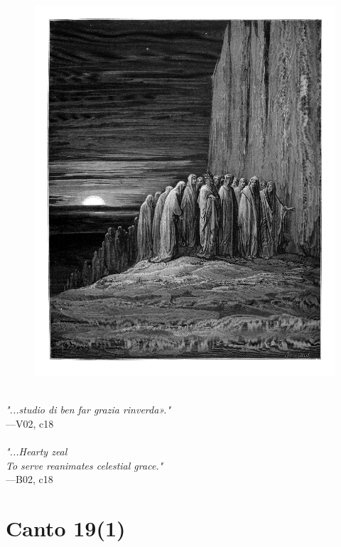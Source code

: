 \documentclass[../Dore_vision.tex]{subfiles}
\begin{document}
\begin{figure}[ht]
\centering
\includegraphics[height=\figsize]{illustrations/book_2/V02, c18.jpg}
\end{figure}

\begin{center}
\begin{minipage}{0.8\linewidth}
\textit{\\
"...studio di ben far grazia rinverda»."} \\
—V02, c18 \\~\\
\textit{"...Hearty zeal\\To serve reanimates celestial grace.\textquotesingle"} \\
—B02, c18
\end{minipage}
\end{center}

\newpage

\section{Canto 19(1)}
\end{document}
